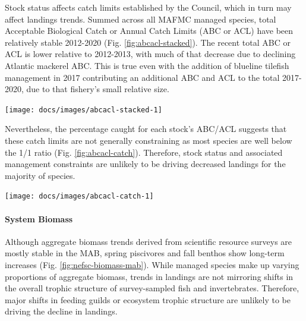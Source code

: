 \documentclass[
  10pt,
]{article}
\let\origfigure\figure
\let\endorigfigure\endfigure
\renewenvironment{figure}[1][2] {
    \expandafter\origfigure\expandafter[H]
} {
    \endorigfigure
}
\begin{document}
Stock status affects catch limits established by the Council, which in
turn may affect landings trends. Summed across all MAFMC managed
species, total Acceptable Biological Catch or Annual Catch Limits (ABC
or ACL) have been relatively stable 2012-2020 (Fig.
\ref{fig:abcacl-stacked}). The recent total ABC or ACL is lower relative
to 2012-2013, with much of that decrease due to declining Atlantic
mackerel ABC. This is true even with the addition of blueline tilefish
management in 2017 contributing an additional ABC and ACL to the total
2017-2020, due to that fishery's small relative size.

\begin{figure}

{\centering \texttt{[image: docs/images/abcacl-stacked-1]} 

}

\caption{Sum of catch limits across all MAFMC managed fisheries.}\label{fig:abcacl-stacked}
\end{figure}

Nevertheless, the percentage caught for each stock's ABC/ACL suggests
that these catch limits are not generally constraining as most species
are well below the 1/1 ratio (Fig. \ref{fig:abcacl-catch}). Therefore,
stock status and associated management constraints are unlikely to be
driving decreased landings for the majority of species.

\begin{figure}

{\centering \texttt{[image: docs/images/abcacl-catch-1]} 

}

\caption{Catch divided by ABC/ACL for MAFMC managed fisheies. Chub mackerel removed due extremely low catch. Outliers = Recreational Black Sea Bass.}\label{fig:abcacl-catch}
\end{figure}

\hypertarget{system-biomass}{%
\paragraph{System Biomass}\label{system-biomass}}

Although aggregate biomass trends derived from scientific resource
surveys are mostly stable in the MAB, spring piscivores and fall benthos
show long-term increases (Fig. \ref{fig:nefsc-biomass-mab}). While
managed species make up varying proportions of aggregate biomass, trends
in landings are not mirroring shifts in the overall trophic structure of
survey-sampled fish and invertebrates. Therefore, major shifts in
feeding guilds or ecosystem trophic structure are unlikely to be driving
the decline in landings.
\end{document}

